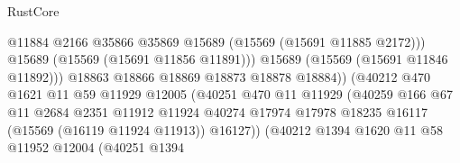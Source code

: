 \begin{lexlean}{RustCore}
\begin{coremodule}
                                                @11884
                                                @2166
                                                @35866
                                                @35869
                                                @15689
                                                (@15569 (@15691 @11885 @2172)))
                                              @15689
                                              (@15569 (@15691 @11856 @11891)))
                                            @15689
                                            (@15569 (@15691 @11846 @11892)))
                                          @18863
                                          @18866
                                          @18869
                                          @18873
                                          @18878
                                          @18884))
                                      (@40212
                                        @470
                                        @1621
                                        @11
                                        @59
                                        @11929
                                        @12005
                                        (@40251
                                          @470
                                          @11
                                          @11929
                                          (@40259
                                            @166
                                            @67
                                            @11
                                            @2684
                                            @2351
                                            @11912
                                            @11924
                                            @40274
                                            @17974
                                            @17978
                                            @18235
                                            @16117
                                            (@15569 (@16119 @11924 @11913))
                                            @16127))
                                        (@40212
                                          @1394
                                          @1620
                                          @11
                                          @58
                                          @11952
                                          @12004
                                          (@40251
                                            @1394

\end{coremodule}
\end{lexlean}
